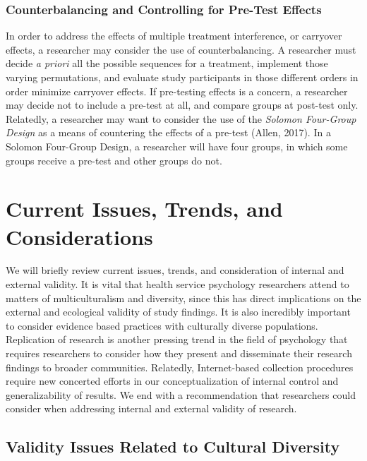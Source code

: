 \documentclass[
  11pt,
]{book}
\begin{document}
\hypertarget{counterbalancing-and-controlling-for-pre-test-effects}{%
\subsubsection{Counterbalancing and Controlling for Pre-Test Effects}\label{counterbalancing-and-controlling-for-pre-test-effects}}

In order to address the effects of multiple treatment interference, or carryover effects, a researcher may consider the use of counterbalancing. A researcher must decide \emph{a priori} all the possible sequences for a treatment, implement those varying permutations, and evaluate study participants in those different orders in order minimize carryover effects. If pre-testing effects is a concern, a researcher may decide not to include a pre-test at all, and compare groups at post-test only. Relatedly, a researcher may want to consider the use of the \emph{Solomon Four-Group Design} as a means of countering the effects of a pre-test (Allen, 2017). In a Solomon Four-Group Design, a researcher will have four groups, in which some groups receive a pre-test and other groups do not.

\hypertarget{current-issues-trends-and-considerations}{%
\section{Current Issues, Trends, and Considerations}\label{current-issues-trends-and-considerations}}

We will briefly review current issues, trends, and consideration of internal and external validity. It is vital that health service psychology researchers attend to matters of multiculturalism and diversity, since this has direct implications on the external and ecological validity of study findings. It is also incredibly important to consider evidence based practices with culturally diverse populations. Replication of research is another pressing trend in the field of psychology that requires researchers to consider how they present and disseminate their research findings to broader communities. Relatedly, Internet-based collection procedures require new concerted efforts in our conceptualization of internal control and generalizability of results. We end with a recommendation that researchers could consider when addressing internal and external validity of research.

\hypertarget{validity-issues-related-to-cultural-diversity}{%
\subsection{Validity Issues Related to Cultural Diversity}\label{validity-issues-related-to-cultural-diversity}}
\end{document}
